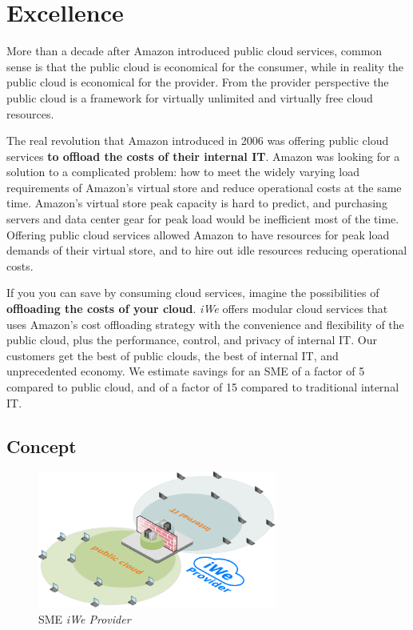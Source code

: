 \renewcommand{\thetable}{\thesection\alph{table}}

\chapter{Excellence}
\label{cha:excellence}

More than a decade after Amazon introduced public cloud services, common sense
is that the public cloud is economical for the consumer, while in reality the
public cloud is economical for the provider.  From the provider perspective the
public cloud is a framework for virtually unlimited and virtually free cloud
resources.

The real revolution that Amazon introduced in 2006 was offering public cloud
services \textbf{to offload the costs of their internal IT}. Amazon was looking
for a solution to a complicated problem: how to meet the widely varying load
requirements of Amazon's virtual store and reduce operational costs at the same
time. Amazon's virtual store peak capacity is hard to predict, and purchasing
servers and data center gear for peak load would be inefficient most of the
time. Offering public cloud services allowed Amazon to have resources for peak
load demands of their virtual store, and to hire out idle resources reducing
operational costs.

If you you can save by consuming cloud services, imagine the possibilities of
\textbf{offloading the costs of your cloud}.  \textit{iWe} offers modular cloud
services that uses Amazon's cost offloading strategy with the convenience and
flexibility of the public cloud, plus the performance, control, and privacy of
internal IT. Our customers get the best of public clouds, the best of internal
IT, and unprecedented economy. We estimate savings for an SME of a factor of 5
compared to public cloud, and of a factor of 15 compared to traditional internal
IT.

\section{Concept}
\label{sec:concept}

\begin{figure}
    \centering
    \includegraphics[width=0.7\textwidth]{images/iwe-providers-consumers-with-template2.pdf}
    \caption{SME \textit{iWe Provider}}
    \label{fig:the-clalld-pvt-pub}
\end{figure}

